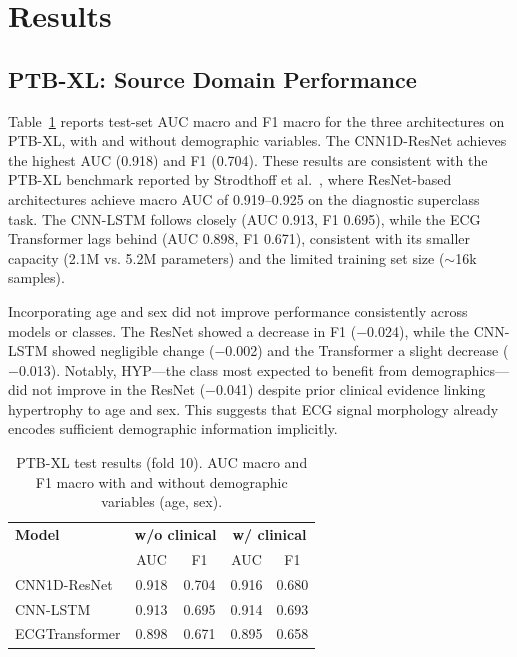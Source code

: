 \documentclass[journal]{IEEEtran}
\begin{document}
\section{Results}

\subsection{PTB-XL: Source Domain Performance}

Table~\ref{tab:ptbxl} reports test-set AUC macro and F1 macro for the three architectures on PTB-XL, with and without demographic variables. The CNN1D-ResNet achieves the highest AUC (0.918) and F1 (0.704). These results are consistent with the PTB-XL benchmark reported by Strodthoff et al.\ \cite{strodthoff2021ptbxl}, where ResNet-based architectures achieve macro AUC of 0.919--0.925 on the diagnostic superclass task. The CNN-LSTM follows closely (AUC 0.913, F1 0.695), while the ECG Transformer lags behind (AUC 0.898, F1 0.671), consistent with its smaller capacity (2.1M vs. 5.2M parameters) and the limited training set size ($\sim$16k samples).

Incorporating age and sex did not improve performance consistently across models or classes. The ResNet showed a decrease in F1 ($-$0.024), while the CNN-LSTM showed negligible change ($-$0.002) and the Transformer a slight decrease ($-$0.013). Notably, HYP---the class most expected to benefit from demographics---did not improve in the ResNet ($-$0.041) despite prior clinical evidence linking hypertrophy to age and sex. This suggests that ECG signal morphology already encodes sufficient demographic information implicitly.

\begin{table}[t]
\caption{PTB-XL test results (fold 10). AUC macro and F1 macro with and without demographic variables (age, sex).}
\label{tab:ptbxl}
\centering
\begin{tabular}{lcccc}
\toprule
\textbf{Model} & \multicolumn{2}{c}{\textbf{w/o clinical}} & \multicolumn{2}{c}{\textbf{w/ clinical}} \\
 & AUC & F1 & AUC & F1 \\
\midrule
CNN1D-ResNet   & 0.918 & 0.704 & 0.916 & 0.680 \\
CNN-LSTM       & 0.913 & 0.695 & 0.914 & 0.693 \\
ECGTransformer & 0.898 & 0.671 & 0.895 & 0.658 \\
\bottomrule
\end{tabular}
\end{table}
\end{document}

